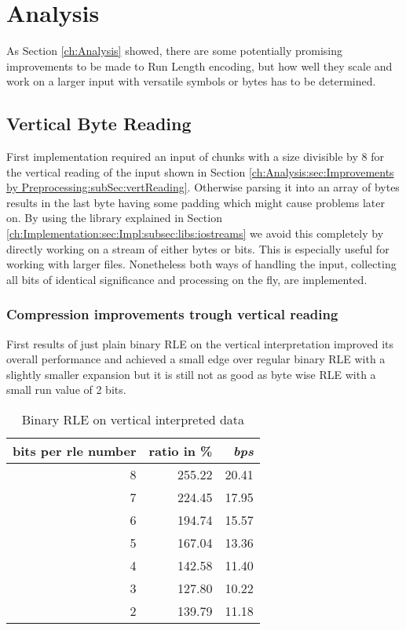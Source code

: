 
\chapter{Analysis}
\label{ch:Conceptual Design}
\par{
As Section \ref{ch:Analysis} showed, there are some potentially promising improvements to be made to Run Length encoding, but how well they scale and work on a larger input with versatile symbols or bytes has to be determined.
}
\section{Vertical Byte Reading}
\label{ch:Conceptual Design:sec:Parallel Byte Reading}
\par{
First implementation required an input of chunks with a size divisible by 8 for the vertical reading of the input shown in Section \ref{ch:Analysis:sec:Improvements by Preprocessing:subSec:vertReading}. Otherwise parsing it into an array of bytes results in the last byte having some padding which might cause problems later on. By using the library explained in Section \ref{ch:Implementation:sec:Impl:subsec:libs:iostreams} we avoid this completely by directly working on a stream of either bytes or bits. This is especially useful for working with larger files. Nonetheless both ways of handling the input, collecting all bits of identical significance and processing on the fly, are implemented.}

\subsection{Compression improvements trough vertical reading}
\par{
First results of just plain binary RLE on the vertical interpretation improved its overall performance and achieved a small edge over regular binary RLE with a slightly smaller expansion but it is still not as good as byte wise RLE with a small run value of 2 bits.
\begin{table}[H]
	\centering
	\begin{tabular}{r|r|r}	
		bits per rle number & ratio in \% & \textit{bps}\\
		\hline
		8 & 255.22 & 20.41\\
		7 & 224.45 & 17.95\\
		6 & 194.74 & 15.57\\
		5 & 167.04 & 13.36\\
		4 & 142.58 & 11.40\\
		3 & 127.80 & 10.22\\
		2 & 139.79 & 11.18 \\
	\end{tabular}
	\caption{Binary RLE on vertical interpreted data}
	\label{tab:t30 binary RLE on vertical interpreted data}
\end{table}
}

